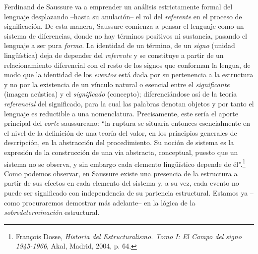 Ferdinand de Saussure va a emprender un análisis estrictamente formal
del lenguaje desplazando --hasta su anulación-- el rol del
\emph{referente} en el proceso de significación. De esta manera,
Saussure comienza a pensar el lenguaje como un sistema de diferencias,
donde no hay términos positivos ni sustancia, pasando el lenguaje a ser
pura \emph{forma}. La identidad de un término, de un \emph{signo}
(unidad lingüística) deja de depender del \emph{referente} y se
constituye a partir de un relacionamiento diferencial con el resto de
los signos que conforman la lengua, de modo que la identidad de los
\emph{eventos} está dada por su pertenencia a la estructura y no por la
existencia de un vínculo natural o esencial entre el \emph{significante}
(imagen acústica) y el \emph{significado} (concepto); diferenciándose
así de la teoría \emph{referencial} del significado, para la cual las
palabras denotan objetos y por tanto el lenguaje es reductible a una
nomenclatura. Precisamente, este sería el aporte principal del
\emph{corte} saussureano: \enquote{la ruptura se situaría entonces esencialmente
en el nivel de la definición de una teoría del valor, en los principios
generales de descripción, en la abstracción del procedimiento. Su noción
de sistema es la expresión de la construcción de una vía abstracta,
conceptual, puesto que un sistema no se observa, y sin embargo cada
elemento lingüístico depende de él}.\footnote{François Dosse,
  \emph{Historia del Estructuralismo. Tomo I: El Campo del signo
  1945-1966}, Akal, Madrid, 2004, p. 64.} Como podemos observar, en
Saussure existe una presencia de la estructura a partir de sus efectos
en cada elemento del sistema y, a su vez, cada evento no puede ser
significado con independencia de su partencia estructural. Estamos ya
--como procuraremos demostrar más adelante-- en la lógica de la
\emph{sobredeterminación} estructural.

